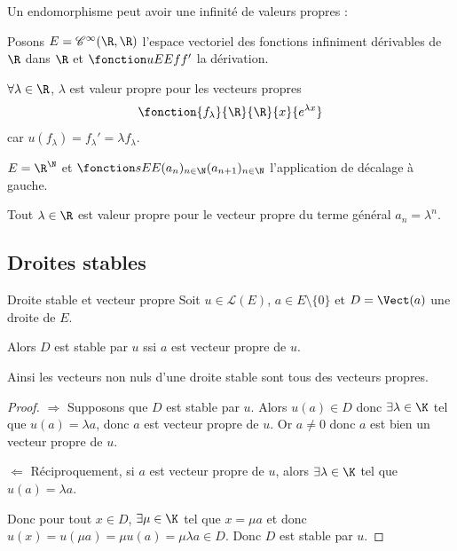Un endomorphisme peut avoir une infinité de valeurs propres :


\begin{exemple}
    Posons $E = \mathscr C^\infty(\R, \R)$ l'espace vectoriel des fonctions 
    infiniment dérivables de $\R$ dans $\R$ et $\fonction u E E f {f'}$ la dérivation. 

    $\forall \lambda \in \R$, $\lambda$ est valeur propre pour les vecteurs propres 
    $$\fonction{f_\lambda}{\R}{\R}{x}{e^{\lambda x}}$$ car
    $u(f_\lambda) = f_\lambda' = \lambda f_\lambda$.
\end{exemple}

\begin{exemple}
    $E = \R^\N$ et $\fonction s E E {(a_n)_{n \in \N}}{(a_{n + 1})_{n \in \N}}$ l'application de décalage à gauche.

    Tout $\lambda \in \R$ est valeur propre pour le vecteur propre du terme général $a_n = \lambda^n$.
\end{exemple}

\subsection{Droites stables }

\begin{proposition}{Droite stable et vecteur propre}{}
    Soit $u \in \mathscr L(E)$, $a \in E \setminus \{0\}$ et $D = \Vect(a)$ une droite de $E$. 

    Alors $D$ est stable par $u$ ssi $a$ est vecteur propre de $u$.

    Ainsi les vecteurs non nuls d'une droite stable sont tous des vecteurs propres. 
\end{proposition}

\begin{proof}
    $\Rightarrow$ Supposons que $D$ est stable par $u$. Alors $u(a) \in D$ donc 
    $\exists \lambda \in \K$ tel que $u(a) = \lambda a$, donc $a$ est vecteur propre de $u$.
    Or $a \neq 0$ donc $a$ est bien un vecteur propre de $u$.

    \lvspace $\Leftarrow$ Réciproquement, si $a$ est vecteur propre de $u$, alors 
    $\exists \lambda \in \K$ tel que $u(a) = \lambda a$. 

    Donc pour tout $x \in D$, $\exists \mu \in \K$ tel que $x = \mu a$ et donc 
    $u(x) = u(\mu a) = \mu u(a) = \mu \lambda a \in D$. Donc $D$ est stable par $u$.
\end{proof}

